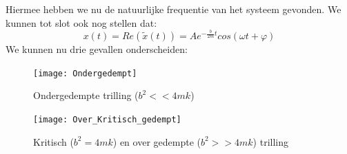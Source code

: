 \documentclass[a4paper,kul]{kulakarticle} %
\begin{document}
Hiermee hebben we nu de natuurlijke frequentie van het systeem gevonden. We kunnen tot slot ook nog stellen dat:
\begin{equation*}
	x(t) = Re(\widetilde{x}(t)) = Ae^{-\frac{b}{2m} t}cos(\omega t + \varphi)
\end{equation*}
We kunnen nu drie gevallen onderscheiden: 
\begin{figure}[htbp]
	\centering
	\texttt{[image: Ondergedempt]}
	\caption[Ondergedempte trilling]{Ondergedempte trilling ($b^2 << 4mk$)}
	\label{fig:ondergedempt}
\end{figure}
\begin{figure}[htbp]
	\centering
	\texttt{[image: Over\_Kritisch\_gedempt]}
	\caption[Kritisch en over gedempte trilling]{Kritisch ($b^2 = 4mk$) en over gedempte ($b^2 >> 4mk$) trilling}
	\label{fig:overkritischgedempt}
\end{figure}


\newpage
\end{document}

